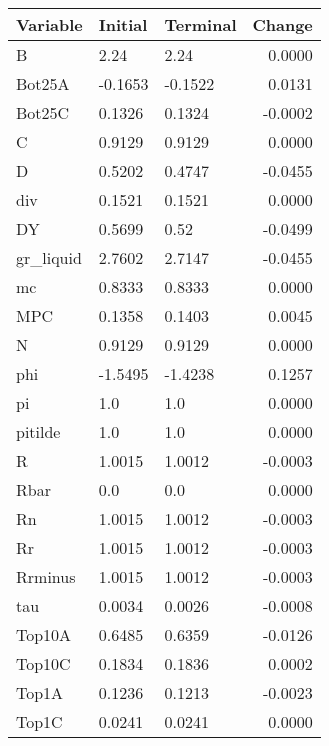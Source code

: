 \begin{table}
\centering
\label{tab:stst_comparison_low_B_limit_permanent}
\begin{tabular}{lllr}
\toprule
                Variable & Initial & Terminal &  Change \\
\midrule
                       B &    2.24 &     2.24 &  0.0000 \\
                  Bot25A & -0.1653 &  -0.1522 &  0.0131 \\
                  Bot25C &  0.1326 &   0.1324 & -0.0002 \\
                       C &  0.9129 &   0.9129 &  0.0000 \\
                       D &  0.5202 &   0.4747 & -0.0455 \\
                     div &  0.1521 &   0.1521 &  0.0000 \\
                      DY &  0.5699 &     0.52 & -0.0499 \\
               gr\_liquid &  2.7602 &   2.7147 & -0.0455 \\
                      mc &  0.8333 &   0.8333 &  0.0000 \\
                     MPC &  0.1358 &   0.1403 &  0.0045 \\
                       N &  0.9129 &   0.9129 &  0.0000 \\
                     phi & -1.5495 &  -1.4238 &  0.1257 \\
                      pi &     1.0 &      1.0 &  0.0000 \\
                 pitilde &     1.0 &      1.0 &  0.0000 \\
                       R &  1.0015 &   1.0012 & -0.0003 \\
                    Rbar &     0.0 &      0.0 &  0.0000 \\
                      Rn &  1.0015 &   1.0012 & -0.0003 \\
                      Rr &  1.0015 &   1.0012 & -0.0003 \\
                 Rrminus &  1.0015 &   1.0012 & -0.0003 \\
                     tau &  0.0034 &   0.0026 & -0.0008 \\
                  Top10A &  0.6485 &   0.6359 & -0.0126 \\
                  Top10C &  0.1834 &   0.1836 &  0.0002 \\
                   Top1A &  0.1236 &   0.1213 & -0.0023 \\
                   Top1C &  0.0241 &   0.0241 &  0.0000 \\

\end{tabular}
\end{table}
